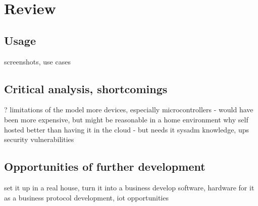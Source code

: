 \chapter{Review} %
\section{Usage}
screenshots, use cases
\section{Critical analysis, shortcomings}
?
limitations of the model
more devices, especially microcontrollers - would have been more expensive, but might be reasonable in a home environment
why self hosted better than having it in the cloud - but needs it sysadm knowledge, ups
security vulnerabilities
\section{Opportunities of further development}
set it up in a real house, turn it into a business
develop software, hardware for it as a business
protocol development, iot opportunities
